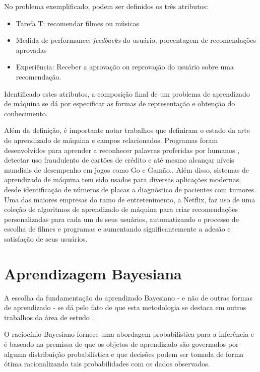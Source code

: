 No problema exemplificado, podem ser definidos os três atributos: \par
\begin{itemize}
    \item Tarefa T: recomendar filmes ou músicas
    \item Medida de performance: \textit{feedbacks} do usuário, porcentagem de recomendações aprovadas
    \item Experiência: Receber a aprovação ou reprovação do usuário sobre uma recomendação.
\end{itemize}

Identificado estes atributos, a composição final de um problema de aprendizado de máquina se dá por especificar as formas de representação e obtenção do conhecimento. \par

Além da definição, é importante notar trabalhos que definiram o estado da arte do aprendizado de máquina e campos relacionados. Programas foram desenvolvidos para aprender a reconhecer palavras proferidas por humanos \cite{DBLP:journals/tsp/WaibelHHSL89}, detectar uso fraudulento de cartões de crédito e até mesmo alcançar níveis mundiais de desempenho em jogos como Go e Gamão.\cite{Mitchell}. Além disso, sistemas de aprendizado de máquina tem sido usados para diversas aplicações modernas, desde identificação de números de placas a diagnóstico de pacientes com tumores. Uma das maiores empresas do ramo de entretenimento, a Netflix, faz uso de uma coleção de algoritmos de aprendizado de máquina para criar recomendações personalizadas para cada um de seus usuários, automatizando o processo de escolha de filmes e programas e aumentando significantemente a adesão e satisfação de seus usuários\cite{Gomez-Uribe:2015:NRS:2869770.2843948}.\par

\section{Aprendizagem Bayesiana}

A escolha da fundamentação do aprendizado Bayesiano - e não de outras formas de aprendizado - se dá pelo fato de que esta metodologia se destaca em outros trabalhos da àrea de estudo \cite{LiuSentAnaSubject, DL4SA, LiuBing, Mitchell}. \par

O raciocínio Bayesiano fornece uma abordagem probabilística para a inferência e é baseado na premissa de que os objetos de aprendizado são governados por alguma distribuição probabilística e que decisões podem ser tomada de forma ótima racionalizando tais probabilidades com os dados observados\cite{Mitchell, Barber:2012:BRM:2207809}.\par

